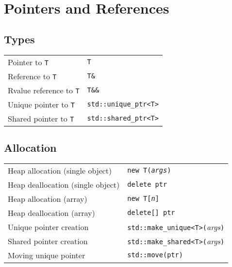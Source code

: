 \section{Pointers and References}

\subsection{Types}
\begin{center}
  \begin{tabular}{ll}
    Pointer to \verb'T' & \verb'T' \\
    Reference to \verb'T' & \verb'T&' \\
    Rvalue reference to \verb'T' & \verb'T&&' \\
    Unique pointer to \verb'T' & \verb'std::unique_ptr<T>' \\
    Shared pointer to \verb'T' & \verb'std::shared_ptr<T>' \\
  \end{tabular}
\end{center}

\subsection{Allocation}
\begin{center}
  \begin{tabular}{ll}
    Heap allocation (single object) & \tt new T({\it args}) \\
    Heap deallocation (single object) & \tt delete ptr \\
    Heap allocation (array) & \tt new T[{\it n}] \\
    Heap deallocation (array) & \tt delete[] ptr \\
    Unique pointer creation & \verb'std::make_unique<T>('{\it args}\verb')' \\
    Shared pointer creation & \verb'std::make_shared<T>('{\it args}\verb')' \\
    Moving unique pointer & \verb'std::move(ptr)' \\
  \end{tabular}
\end{center}


